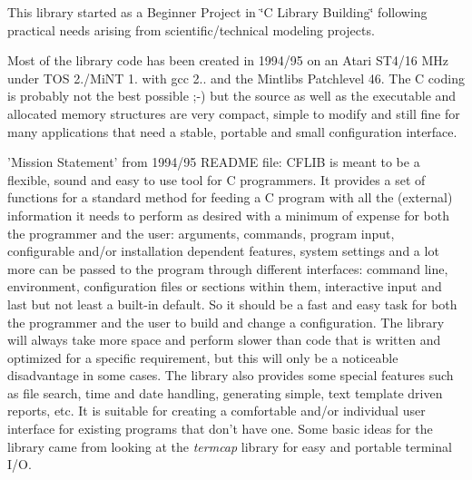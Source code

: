 This library started as a Beginner Project in \char`\"{}\-C Library Building\char`\"{} following practical needs arising from scientific/technical modeling projects.

Most of the library code has been created in 1994/95 on an Atari S\-T4/16 M\-Hz under T\-O\-S 2./\-Mi\-N\-T 1. with gcc 2.. and the Mintlibs Patchlevel 46. The C coding is probably not the best possible ;-\/) but the source as well as the executable and allocated memory structures are very compact, simple to modify and still fine for many applications that need a stable, portable and small configuration interface.

\begin{DoxyParagraph}{'Mission Statement' from 1994/95 R\-E\-A\-D\-M\-E file\-:}
C\-F\-L\-I\-B is meant to be a flexible, sound and easy to use tool for C programmers. It provides a set of functions for a standard method for feeding a C program with all the (external) information it needs to perform as desired with a minimum of expense for both the programmer and the user\-: arguments, commands, program input, configurable and/or installation dependent features, system settings and a lot more can be passed to the program through different interfaces\-: command line, environment, configuration files or sections within them, interactive input and last but not least a built-\/in default. So it should be a fast and easy task for both the programmer and the user to build and change a configuration. The library will always take more space and perform slower than code that is written and optimized for a specific requirement, but this will only be a noticeable disadvantage in some cases. The library also provides some special features such as file search, time and date handling, generating simple, text template driven reports, etc. It is suitable for creating a comfortable and/or individual user interface for existing programs that don't have one. Some basic ideas for the library came from looking at the {\itshape termcap\/} library for easy and portable terminal I/\-O. \par
 
\end{DoxyParagraph}
